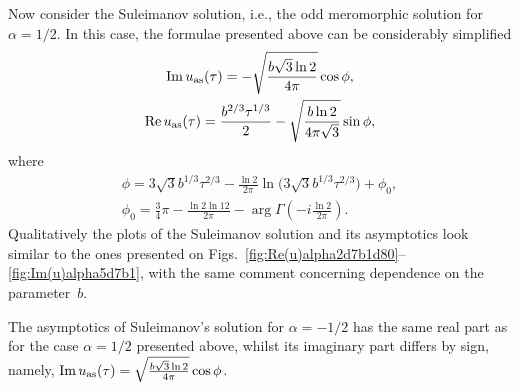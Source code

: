 \documentclass[pdftex]{sigma}
\numberwithin{equation}{section}
\begin{document}
Now consider the Suleimanov solution, i.e., the odd meromorphic solution for $\alpha=1/2$. In this case, the formulae presented above can be considerably simplified
\begin{gather*}
\operatorname{Im}u_{\rm as}(\tau) =-\sqrt{\frac{b\sqrt{3}\ln2}{4\pi}} \cos{\phi},\\
\operatorname{Re}u_{\rm as}(\tau) =\frac{b^{2/3}\tau^{1/3}}2-\sqrt{\frac{b\ln2}{4\pi\sqrt{3}}} \sin{\phi},
\end{gather*}
where
\begin{gather*}
\phi =3\sqrt{3} b^{1/3}\tau^{2/3}-\frac{\ln2}{2\pi}\ln\big(3\sqrt{3} b^{1/3}\tau^{2/3}\big)+\phi_0,\\
\phi_0 =\frac34\pi-\frac{\ln2\ln{12}}{2\pi}-\arg\Gamma\left(-i\frac{\ln2}{2\pi}\right).
\end{gather*}
Qualitatively the plots of the Suleimanov solution and its asymptotics look similar to the ones
presented on Figs.~\ref{fig:Re(u)alpha2d7b1d80}--\ref{fig:Im(u)alpha5d7b1}, with the same comment
concerning dependence on the parameter~$b$.
\begin{Remark}
The asymptotics of Suleimanov's solution for $\alpha=-1/2$ has the same real part as for the case $\alpha=1/2$
presented above, whilst its imaginary part differs by sign, namely,
$\operatorname{Im}u_{\rm as}(\tau)=\sqrt{\frac{b\sqrt{3}\ln2}{4\pi}} \cos{\phi}$.
\end{Remark}
\end{document}
